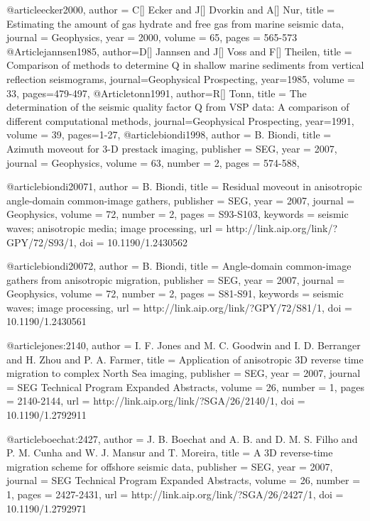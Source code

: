 @article{ecker2000,
  author = {C[] Ecker and J[] Dvorkin and A[] Nur},
  title = {Estimating the amount of gas hydrate and free gas from marine seismic data},
  journal = {Geophysics},
  year = {2000},
  volume = {65},
  pages = {565-573}
}
@Article{jannsen1985,
  author={D[] Jannsen and J[] Voss and F[] Theilen},
  title = {Comparison of methods to determine Q in shallow marine sediments from vertical reflection seismograms},
  journal={Geophysical Prospecting},
  year=1985,
  volume = 33,
  pages={479-497},
}
@Article{tonn1991,
  author={R[] Tonn},
  title = {The determination of the seismic quality factor Q from VSP data: A comparison of different computational methods},
  journal={Geophysical Prospecting},
  year=1991,
  volume = 39,
  pages={1-27},
}
@article{biondi1998,
  author =	 {B. Biondi},
  title =	 {Azimuth moveout for 3-D prestack imaging},
  publisher =	 {SEG},
  year =	 2007,
  journal =	 {Geophysics},
  volume =	 63,
  number =	 2,
  pages =	 {574-588},
}

@article{biondi20071,
  author =	 {B. Biondi},
  title =	 {Residual moveout in anisotropic angle-domain
                  common-image gathers},
  publisher =	 {SEG},
  year =	 2007,
  journal =	 {Geophysics},
  volume =	 72,
  number =	 2,
  pages =	 {S93-S103},
  keywords =	 {seismic waves; anisotropic media; image processing},
  url =		 {http://link.aip.org/link/?GPY/72/S93/1},
  doi =		 {10.1190/1.2430562}
}

@article{biondi20072,
  author =	 {B. Biondi},
  title =	 {Angle-domain common-image gathers from anisotropic
                  migration},
  publisher =	 {SEG},
  year =	 2007,
  journal =	 {Geophysics},
  volume =	 72,
  number =	 2,
  pages =	 {S81-S91},
  keywords =	 {seismic waves; image processing},
  url =		 {http://link.aip.org/link/?GPY/72/S81/1},
  doi =		 {10.1190/1.2430561}
}

@article{jones:2140,
  author =	 {I. F. Jones and M. C. Goodwin and I. D. Berranger
                  and H. Zhou and P. A. Farmer},
  title =	 {Application of anisotropic {3D} reverse time
                  migration to complex {N}orth {S}ea imaging},
  publisher =	 {SEG},
  year =	 2007,
  journal =	 {SEG Technical Program Expanded Abstracts},
  volume =	 26,
  number =	 1,
  pages =	 {2140-2144},
  url =		 {http://link.aip.org/link/?SGA/26/2140/1},
  doi =		 {10.1190/1.2792911}
}

@article{boechat:2427,
  author =	 {J. B. Boechat and A. B.
                  and D. M. S. Filho and P. M. Cunha and
                  W. J. Mansur and T. Moreira},
  title =	 {A {3D} reverse-time migration scheme for offshore
                  seismic data},
  publisher =	 {SEG},
  year =	 2007,
  journal =	 {SEG Technical Program Expanded Abstracts},
  volume =	 26,
  number =	 1,
  pages =	 {2427-2431},
  url =		 {http://link.aip.org/link/?SGA/26/2427/1},
  doi =		 {10.1190/1.2792971}
}

